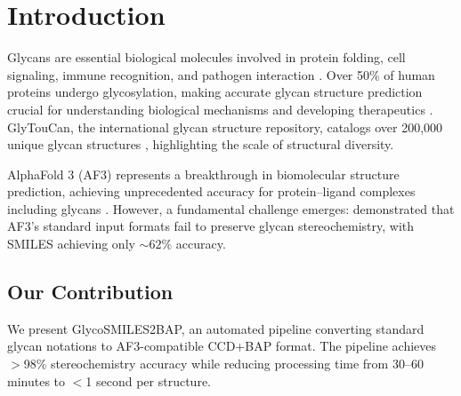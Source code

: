 \documentclass[numsec,webpdf,modern,large]{bioinfo}
\begin{document}
\maketitle

\section{Introduction}

Glycans are essential biological molecules involved in protein folding, cell signaling, immune recognition, and pathogen interaction \citep{varki2017}. Over 50\% of human proteins undergo glycosylation, making accurate glycan structure prediction crucial for understanding biological mechanisms and developing therapeutics \citep{helenius2004}. GlyTouCan, the international glycan structure repository, catalogs over 200,000 unique glycan structures \citep{tiemeyer2016}, highlighting the scale of structural diversity.

AlphaFold 3 (AF3) represents a breakthrough in biomolecular structure prediction, achieving unprecedented accuracy for protein--ligand complexes including glycans \citep{abramson2024}. However, a fundamental challenge emerges: \citet{huang2025} demonstrated that AF3's standard input formats fail to preserve glycan stereochemistry, with SMILES achieving only ${\sim}62\%$ accuracy.

\subsection{Our Contribution}

We present GlycoSMILES2BAP, an automated pipeline converting standard glycan notations to AF3-compatible CCD+BAP format. The pipeline achieves $>$98\% stereochemistry accuracy while reducing processing time from 30--60 minutes to $<$1 second per structure.

\end{document}

